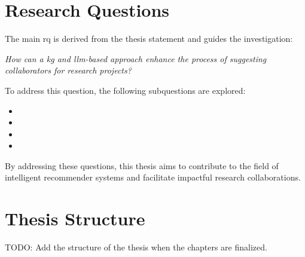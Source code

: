\section{Research Questions}\label{sec:research-questions}
The main \gls{rq} is derived from the thesis statement and guides the investigation:
\begin{center}
	\textit{How can a \gls{kg} and \gls{llm}-based approach enhance the process of suggesting collaborators for research projects?}
\end{center}

To address this question, the following subquestions are explored:
\begin{itemize}
	\item \rqOne
	\item \rqTwo
	\item \rqThree
	\item \rqFour
\end{itemize}


By addressing these questions, this thesis aims to contribute to the field of intelligent recommender systems and facilitate impactful research collaborations.

\section{Thesis Structure}\label{sec:thesis-structure}
TODO: Add the structure of the thesis when the chapters are finalized.

